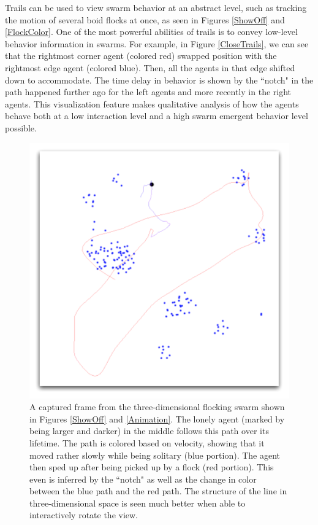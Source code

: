 \documentclass[conference]{IEEEtran}
\begin{document}
Trails can be used to view swarm behavior at an abstract level, such as tracking the motion of several boid
flocks at once, as seen in Figures \ref{ShowOff} and \ref{FlockColor}.
One of the most powerful abilities of trails is to convey low-level behavior information in swarms. For example,
in Figure \ref{CloseTrails}, we can see that the rightmost corner agent (colored red) swapped position with the rightmost
edge agent (colored blue). Then, all the agents in that edge shifted down to accommodate.
The time delay in behavior is shown by the ``notch" in the path happened further ago for the left agents and more recently
in the right agents.
This visualization feature makes qualitative analysis of how the agents behave both at a low interaction level
and a high swarm emergent behavior level possible.







\begin{figure}
\centering
\includegraphics[scale=.33]{images/track.pdf}
\caption{
A captured frame from the three-dimensional flocking swarm shown in Figures \ref{ShowOff} and \ref{Animation}.
The lonely agent (marked by being larger and darker) in the middle follows this path over its lifetime.
The path is colored based on velocity, showing that it moved rather slowly while being solitary (blue portion).
The agent then sped up after being picked up by a flock (red portion). This even is inferred by the ``notch"
as well as the change in color between the blue path and the red path.
The structure of the line in three-dimensional space
is seen much better when able to interactively rotate the view.}
\label{Track}
\end{figure}
\end{document}
